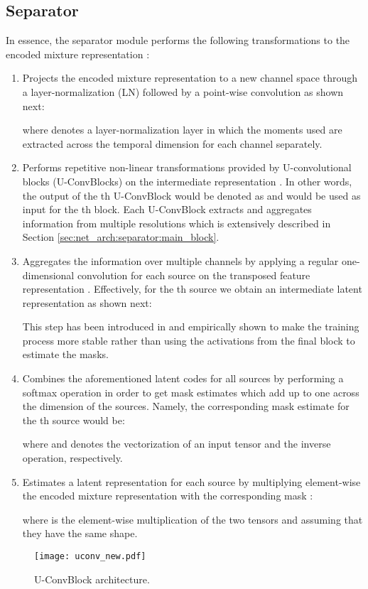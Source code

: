 \subsection{Separator}
\label{sec:net_arch:separator}
In essence, the separator  module performs the following transformations to the encoded mixture representation :
\begin{enumerate}
    \item Projects the encoded mixture representation  to a new channel space through a layer-normalization (LN) \cite{ba2016layernormalization} followed by a point-wise convolution as shown next:
    
    where  denotes a layer-normalization layer in which the moments used are extracted across the temporal dimension for each channel separately.
    \item Performs repetitive non-linear transformations provided by  U-convolutional blocks (U-ConvBlocks) on the intermediate representation . In other words, the output of the th U-ConvBlock would be denoted as  and would be used as input for the th block. Each U-ConvBlock extracts and aggregates information from multiple resolutions which is extensively described in Section \ref{sec:net_arch:separator:main_block}.  
    \item Aggregates the information over multiple channels by applying a regular one-dimensional convolution for each source on the transposed feature representation . Effectively, for the th source we obtain an intermediate latent representation as shown next:
    
    
    This step has been introduced in \cite{tzinis2019two} and empirically shown to make the training process more stable rather than using the activations from the final block  to estimate the masks.
    \item Combines the aforementioned latent codes for all sources  by performing a softmax operation in order to get mask estimates  which add up to one across the dimension of the sources. Namely, the corresponding mask estimate for the th source would be:
    
    where  and  denotes the vectorization of an input tensor and the inverse operation, respectively. 
    \item Estimates a latent representation  for each source by multiplying element-wise the encoded mixture representation  with the corresponding mask :
    
    where  is the element-wise multiplication of the two tensors  and  assuming that they have the same shape. 
\end{enumerate}
\begin{figure}[!htb]
    \centering
      \texttt{[image: uconv\_new.pdf]}
      \caption{U-ConvBlock architecture.}
      \label{fig:uconvblock}
\end{figure}



